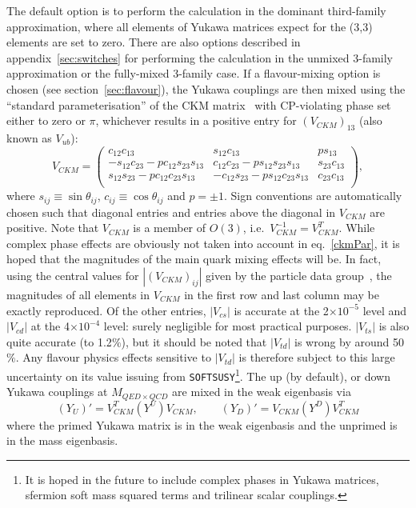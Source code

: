 \documentclass{article}
\begin{document}
The default option is to perform the calculation in the 
dominant third-family approximation, where all elements of Yukawa matrices
expect for the (3,3) elements are set to zero.
There are also options described in
appendix~\ref{sec:switches} for performing the calculation in the unmixed
3-family approximation or the fully-mixed 3-family case.
If a flavour-mixing option is chosen (see section~\ref{sec:flavour}),
the Yukawa couplings are then mixed using the ``standard parameterisation''
of the CKM matrix~\cite{Groom:2000in} with CP-violating phase set either to
zero or $\pi$, whichever results in a positive entry for $(V_{CKM})_{13}$
(also known as $V_{ub}$):
\begin{equation}
V_{CKM} = \left( \begin{array} {ccc}
c_{12} c_{13}   & s_{12} c_{13}   & p s_{13} \\
-s_{12} c_{23} -p c_{12} s_{23} s_{13} & c_{12} c_{23} -p s_{12} s_{23} s_{13} & 
s_{23} c_{13} \\
s_{12} s_{23} - p c_{12} c_{23} s_{13} & -c_{12} s_{23} - p s_{12} c_{23} s_{13} &
c_{23} c_{13} \\
\end{array} \right), \label{ckmPar}
\end{equation}
where $s_{ij}\equiv \sin \theta_{ij}$, $c_{ij}\equiv \cos \theta_{ij}$ and
$p=\pm 1$. Sign conventions are automatically chosen such that diagonal entries and entries
above the diagonal in $V_{CKM}$ are positive. Note that $V_{CKM}$ is a member
of $O(3)$, i.e.\ $V_{CKM}^{-1}= V_{CKM}^T$.
While complex phase effects are obviously not taken into account in
eq.~\ref{ckmPar}, it is hoped that the magnitudes of the main quark mixing
effects will be. In fact, using the central values for $|(V_{CKM})_{ij}|$
given by 
the particle data group~\cite{Groom:2000in}, the magnitudes of all elements in
$V_{CKM}$ in the 
first row and last column may be exactly reproduced. Of the other entries, 
$|V_{cs}|$ is accurate at the 2$\times 10^{-5}$ level and
$|V_{cd}|$ at the 4$\times 10^{-4}$ level: surely negligible for most practical
purposes. $|V_{ts}|$ is also quite accurate (to 1.2$\%$), but 
it should be noted that $|V_{td}|$ is wrong by around 50$\%$. Any
flavour physics effects sensitive to $|V_{td}|$ is therefore subject to
this large uncertainty on its value issuing from {\tt SOFTSUSY}\footnote{It is
  hoped 
in the future to include complex phases in Yukawa matrices,
sfermion soft mass squared terms and trilinear scalar couplings.}.
The up (by default), or down Yukawa couplings at $M_{QED \times QCD}$ are mixed in the
weak eigenbasis via
\begin{equation}
(Y_U)'=V_{CKM}^T (Y^U) V_{CKM}, \qquad 
(Y_D)'=V_{CKM} (Y^D) V_{CKM}^T \label{ckm}
\end{equation}
where the primed Yukawa matrix is in the weak eigenbasis and the unprimed is
in the mass eigenbasis. 
\end{document}
